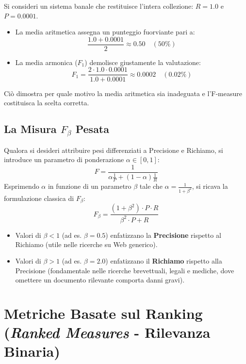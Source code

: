\begin{example}
Si consideri un sistema banale che restituisce l'intera collezione: $R = 1.0$ e $P = 0.0001$.
\begin{itemize}
    \item La media aritmetica assegna un punteggio fuorviante pari a:
    \[
    \frac{1.0 + 0.0001}{2} \approx 0.50 \quad (50\%)
    \]
    \item La media armonica ($F_1$) demolisce giustamente la valutazione:
    \[
    F_1 = \frac{2 \cdot 1.0 \cdot 0.0001}{1.0 + 0.0001} \approx 0.0002 \quad (0.02\%)
    \]
\end{itemize}
Ciò dimostra per quale motivo la media aritmetica sia inadeguata e l'F-measure costituisca la scelta corretta.
\end{example}

\subsection{\texorpdfstring{La Misura $F_\beta$ Pesata}{La Misura F-beta Pesata}}
Qualora si desideri attribuire pesi differenziati a Precisione e Richiamo, si introduce un parametro di ponderazione $\alpha \in [0, 1]$:
\begin{equation}
F = \frac{1}{\alpha \frac{1}{P} + (1 - \alpha) \frac{1}{R}}
\end{equation}
Esprimendo $\alpha$ in funzione di un parametro $\beta$ tale che $\alpha = \frac{1}{1 + \beta^2}$, si ricava la formulazione classica di \textbf{$F_\beta$}:
\begin{equation}
F_\beta = \frac{(1 + \beta^2) \cdot P \cdot R}{\beta^2 \cdot P + R}
\end{equation}
\begin{itemize}
    \item Valori di $\beta < 1$ (ad es. $\beta = 0.5$) enfatizzano la \textbf{Precisione} rispetto al Richiamo (utile nelle ricerche su Web generico).
    \item Valori di $\beta > 1$ (ad es. $\beta = 2.0$) enfatizzano il \textbf{Richiamo} rispetto alla Precisione (fondamentale nelle ricerche brevettuali, legali e mediche, dove omettere un documento rilevante comporta danni gravi).
\end{itemize}

\FloatBarrier
\section{Metriche Basate sul Ranking (\textit{Ranked Measures} - Rilevanza Binaria)}

